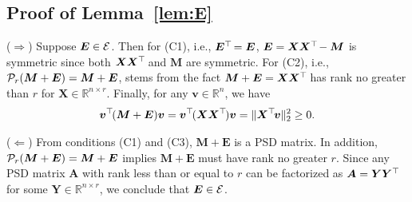 \documentclass{article}
\def\P{{\cal P}}
\def\E{{\cal E}}
\def\R{{\mathbb R}}
\newcommand{\norm}[1]{\|#1\|} %
\newcommand{\topnew}{\top \hspace{-0.05cm}}
\begin{document}
\subsection{Proof of Lemma~\ref{lem:E}}
($\Rightarrow$) Suppose $\bm E \in \E$. Then for (C1), i.e., $\bm E^\topnew = \bm E$, $\bm E = \bm X \bm X^\topnew - \bm M$ is symmetric since both $\bm X \bm X^\topnew$ and $\bm M$ are symmetric. 
For (C2), i.e., $\P_r (\bm M + \bm E) = \bm M + \bm E$, stems from the fact $\bm M + \bm E = \bm X \bm X^\topnew$ has rank no greater than $r$ for $\bm X \in \R^{n \times r}$. Finally, for any $\bm v \in \R^n$, we have
\begin{align*}
    \bm v^\topnew (\bm M + \bm E) \bm v = \bm v^\topnew (\bm X \bm X^\topnew) \bm v = \norm{\bm X^\topnew \bm v}_2^2 \geq 0 .
\end{align*}

\noindent ($\Leftarrow$) From conditions (C1) and (C3), $\bm M + \bm E$ is a PSD matrix. In addition, $\P_r(\bm M + \bm E) = \bm M + \bm E$ implies $\bm M + \bm E$ must have rank no greater $r$. Since any PSD matrix $\bm A$ with rank less than or equal to $r$ can be factorized as $\bm A = \bm Y \bm Y^\topnew$ for some $\bm Y \in \R^{n \times r}$, we conclude that $\bm E \in \E$. 
\end{document}
